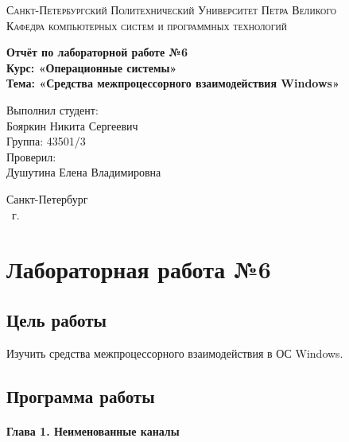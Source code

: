 \documentclass[14pt,a4paper,report]{report}
\begin{document}
\def\contentsname{Содержание}

\begin{titlepage}
	\begin{center}
		\textsc{Санкт-Петербургский Политехнический 
			Университет Петра Великого\\[5mm]
			Кафедра компьютерных систем и программных технологий}
		
		\vfill
		
		\textbf{Отчёт по лабораторной работе №6\\[3mm]
			Курс: «Операционные системы»\\[6mm]
			Тема: «Средства межпроцессорного взаимодействия Windows»\\[35mm]
		}
	\end{center}
	
	\hfill
	\begin{minipage}{.5\textwidth}
		Выполнил студент:\\[2mm] 
		Бояркин Никита Сергеевич\\
		Группа: 43501/3\\[5mm]
		
		Проверил:\\[2mm] 
		Душутина Елена Владимировна
	\end{minipage}
	\vfill
	\begin{center}
		Санкт-Петербург\\ \the\year\ г.
	\end{center}
\end{titlepage}

\tableofcontents
\clearpage

\chapter{Лабораторная работа №6}

\section{Цель работы}

Изучить средства межпроцессорного взаимодействия в ОС Windows.

\section{Программа работы}

\subsubsection{Глава 1. Неименованные каналы}
\end{document}
